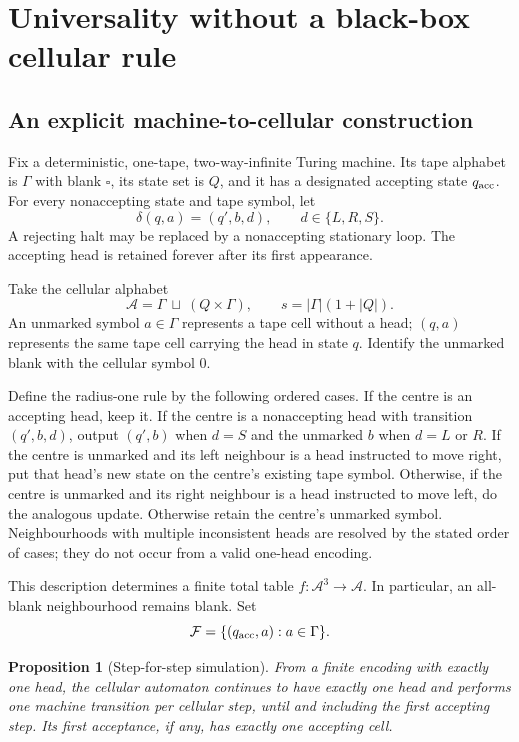 \documentclass[11pt,letterpaper]{article}
\numberwithin{equation}{section}
\newtheorem{proposition}[theorem]{Proposition}
\theoremstyle{definition}
\newcommand{\A}{\mathcal A}
\newcommand{\F}{\mathcal F}
\begin{document}
\section{Universality without a black-box cellular rule}
\label{pwh:uh:sec:universality}

\subsection{An explicit machine-to-cellular construction}

Fix a deterministic, one-tape, two-way-infinite Turing machine. Its tape
alphabet is $\Gamma$ with blank $\square$, its state set is $Q$, and it
has a designated accepting state $q_{\rm acc}$. For every nonaccepting
state and tape symbol, let
\[
 \delta(q,a)=(q',b,d),\qquad d\in\{L,R,S\}.
\]
A rejecting halt may be replaced by a nonaccepting stationary loop.
The accepting head is retained forever after its first appearance.

Take the cellular alphabet
\begin{equation}
 \A=\Gamma\ \sqcup\ (Q\times\Gamma),
 \qquad s=|\Gamma|(1+|Q|).
 \label{pwh:uh:eq:tm-alphabet}
\end{equation}
An unmarked symbol $a\in\Gamma$ represents a tape cell without a head;
$(q,a)$ represents the same tape cell carrying the head in state $q$.
Identify the unmarked blank with the cellular symbol $0$.

Define the radius-one rule by the following ordered cases. If the centre
is an accepting head, keep it. If the centre is a nonaccepting head with
transition $(q',b,d)$, output $(q',b)$ when $d=S$ and the unmarked $b$
when $d=L$ or $R$. If the centre is unmarked and its left neighbour is a
head instructed to move right, put that head's new state on the centre's
existing tape symbol. Otherwise, if the centre is unmarked and its right
neighbour is a head instructed to move left, do the analogous update.
Otherwise retain the centre's unmarked symbol. Neighbourhoods with
multiple inconsistent heads are resolved by the stated order of cases;
they do not occur from a valid one-head encoding.

This description determines a finite total table $f:\A^3\to\A$.
In particular, an all-blank neighbourhood remains blank. Set
\[
 \F=\{(q_{\rm acc},a):a\in\Gamma\}.
\]

\begin{proposition}[Step-for-step simulation]
\label{pwh:uh:prop:TM}
From a finite encoding with exactly one head, the cellular automaton
continues to have exactly one head and performs one machine transition
per cellular step, until and including the first accepting step. Its
first acceptance, if any, has exactly one accepting cell.
\end{proposition}
\end{document}
